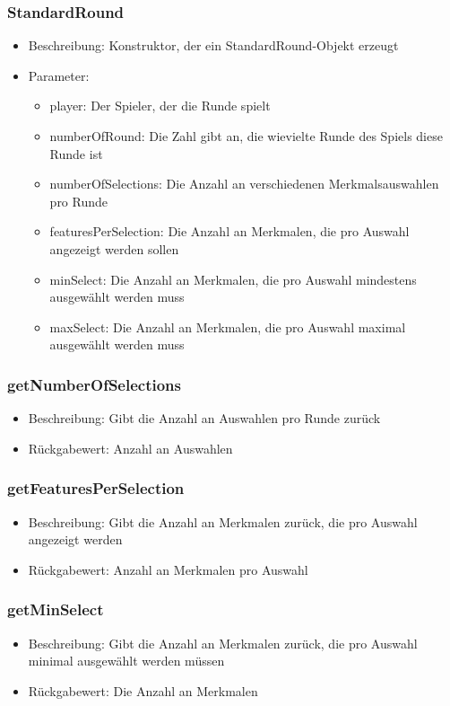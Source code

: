\documentclass[a4paper]{scrreprt}
\begin{document}
	\subsubsection{StandardRound}
	\begin{itemize}
		\item Beschreibung: Konstruktor, der ein StandardRound-Objekt erzeugt
		\item Parameter:
		\begin{itemize}
			\item player: Der Spieler, der die Runde spielt
			\item numberOfRound: Die Zahl gibt an, die wievielte Runde des Spiels diese Runde ist
			\item numberOfSelections: Die Anzahl an verschiedenen Merkmalsauswahlen pro Runde
			\item featuresPerSelection: Die Anzahl an Merkmalen, die pro Auswahl angezeigt werden sollen
			\item minSelect: Die Anzahl an Merkmalen, die pro Auswahl mindestens ausgewählt werden muss
			\item maxSelect: Die Anzahl an Merkmalen, die pro Auswahl maximal ausgewählt werden muss
		\end{itemize}
	\end{itemize}
	\subsubsection{getNumberOfSelections}
	\begin{itemize}
		\item Beschreibung: Gibt die Anzahl an Auswahlen pro Runde zurück
		\item Rückgabewert: Anzahl an Auswahlen
	\end{itemize}
	\subsubsection{getFeaturesPerSelection}
	\begin{itemize}
		\item Beschreibung: Gibt die Anzahl an Merkmalen zurück, die pro Auswahl angezeigt werden
		\item Rückgabewert: Anzahl an Merkmalen pro Auswahl
	\end{itemize}
	\subsubsection{getMinSelect}
	\begin{itemize}
		\item Beschreibung: Gibt die Anzahl an Merkmalen zurück, die pro Auswahl minimal ausgewählt werden müssen
		\item Rückgabewert: Die Anzahl an Merkmalen
	\end{itemize}
\end{document}
